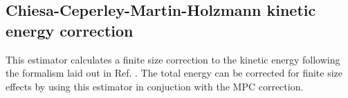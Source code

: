 

\subsection{Chiesa-Ceperley-Martin-Holzmann kinetic energy correction}

This estimator calculates a finite size correction to the kinetic energy following the formalism laid out in Ref. \cite{Chiesa2006}.  The total energy can be corrected for finite size effects by using this estimator in conjuction with the MPC correction.

